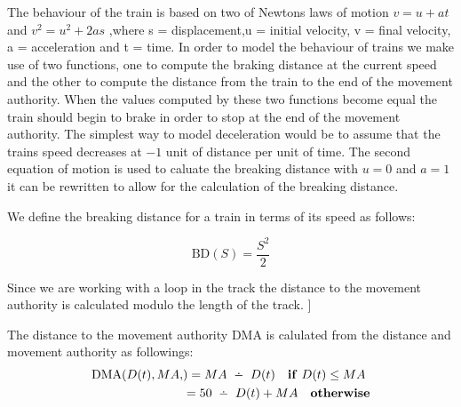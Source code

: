 The behaviour of the train is based on two of Newtons laws of motion $v = u +at$ and  $v^2 = u^2 +2as$
,where s = displacement,u = initial velocity, v = final velocity, a = acceleration and t = time. In order to model the behaviour of trains we make use of two functions, one to compute the braking distance at the current speed and the other to compute the distance from the train to the end of the movement authority. When the values computed by these two functions become equal the train should begin to brake in order to stop at the end of the movement authority. The simplest way to model deceleration would be to assume that the trains speed decreases at $-1$ unit of distance per unit of time. The second equation of motion  is used to caluate the breaking distance with $u = 0$ and $a = 1$ it can be rewritten to allow for the calculation of the breaking distance.
\medskip

\newcommand{\BD}[1]{\mathrm{BD}(#1)}
\begin{mydef}
We define the breaking distance for a train in terms of its speed as follows:

$$\BD{S} = \frac{S^2}{2} $$

\end{mydef}
\medskip
Since we are working with a loop in the track the distance to the movement authority is calculated modulo the length of the track. 
\medskip
\newcommand{\DMA}[2]{\mathrm{DMA}(#1,#2)}
]\begin{mydef}

The distance to the movement authority $\mathrm{DMA}$ is calulated from the distance and movement authority as followings:
\begin{align*}
\DMA{D(t), MA} & = MA \Monus D(t) \quad \mathbf{if} \ D(t) \leq MA \\
                         & = 50 \Monus D(t) + MA \quad \mathbf{otherwise}
\end{align*}



\end{mydef}

